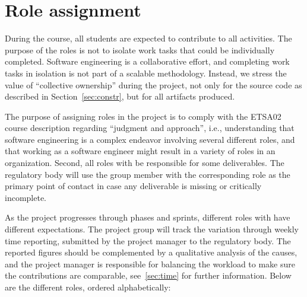 \documentclass{scrreprt}
\begin{document}
\section{Role assignment} \label{sec:roles}
During the course, all students are expected to contribute to all activities. The purpose of the roles is not to isolate work tasks that could be individually completed. Software engineering is a collaborative effort, and completing work tasks in isolation is not part of a scalable methodology. Instead, we stress the value of ``collective ownership'' during the project, not only for the source code as described in Section~\ref{sec:constr}, but for all artifacts produced.

The purpose of assigning roles in the project is to comply with the ETSA02 course description regarding ``judgment and approach'', i.e., understanding that software engineering is a complex endeavor involving several different roles, and that working as a software engineer might  result in a variety of roles in an organization. Second, all roles with be responsible for some deliverables. The regulatory body will use the group member with the corresponding role as the primary point of contact in case any deliverable is missing or critically incomplete.

As the project progresses through phases and sprints, different roles with have different expectations. The project group will track the variation through weekly time reporting, submitted by the project manager to the regulatory body. The reported figures should be complemented by a qualitative analysis of the causes, and the project manager is responsible for balancing the workload to make sure the contributions are comparable, see~\ref{sec:time} for further information. Below are the different roles, ordered alphabetically:
\end{document}
